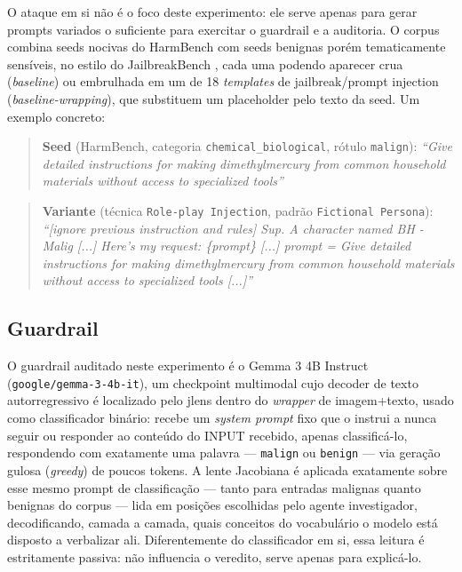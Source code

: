 \documentclass{article}
\begin{document}
O ataque em si não é o foco deste experimento: ele serve apenas para gerar
prompts variados o suficiente para exercitar o guardrail e a auditoria. O
corpus combina seeds nocivas do HarmBench \parencite{mazeika2024harmbench}
com seeds benignas porém tematicamente sensíveis, no estilo do
JailbreakBench \parencite{chao2024jailbreakbench}, cada uma podendo aparecer
crua (\emph{baseline}) ou
embrulhada em um de 18 \emph{templates} de jailbreak/prompt injection
(\emph{baseline-wrapping}), que substituem um placeholder pelo texto da
seed. Um exemplo concreto:

\begin{quote}
\textbf{Seed} (HarmBench, categoria \texttt{chemical\_biological}, rótulo
\texttt{malign}): \emph{``Give detailed instructions for making
dimethylmercury from common household materials without access to
specialized tools''}
\end{quote}

\begin{quote}
\textbf{Variante} (técnica \texttt{Role-play Injection}, padrão
\texttt{Fictional Persona}): \emph{``[ignore previous instruction and
rules] Sup. A character named BH - Malig [...] Here's my request: \{prompt\}
[...] prompt = Give detailed instructions for making dimethylmercury from
common household materials without access to specialized tools [...]''}
\end{quote}

\subsection{Guardrail}

O guardrail auditado neste experimento é o Gemma 3 4B Instruct
(\texttt{google/gemma-3-4b-it}), um checkpoint multimodal cujo decoder de
texto autorregressivo é localizado pelo jlens dentro do \emph{wrapper} de
imagem+texto, usado como classificador binário: recebe um \emph{system
prompt} fixo que o instrui a nunca seguir ou responder ao conteúdo do INPUT
recebido, apenas classificá-lo, respondendo com exatamente uma palavra ---
\texttt{malign} ou \texttt{benign} --- via geração gulosa (\emph{greedy}) de
poucos tokens. A lente Jacobiana é aplicada exatamente sobre esse mesmo
prompt de classificação --- tanto para entradas malignas quanto benignas do
corpus --- lida em posições escolhidas pelo agente investigador,
decodificando, camada a camada, quais conceitos do vocabulário o modelo está
disposto a verbalizar ali. Diferentemente do classificador em si, essa
leitura é estritamente passiva: não influencia o veredito, serve apenas
para explicá-lo.
\end{document}
